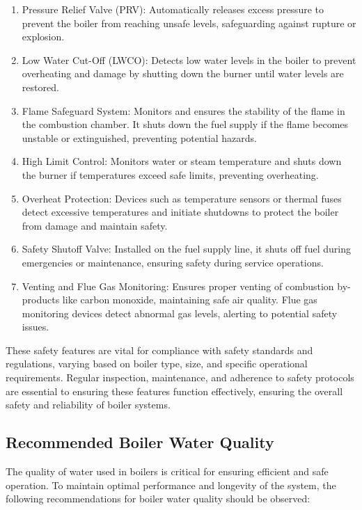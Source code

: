 \begin{enumerate}
    \item Pressure Relief Valve (PRV): Automatically releases excess pressure to prevent the boiler from reaching unsafe levels, safeguarding against rupture or explosion.
    \item Low Water Cut-Off (LWCO): Detects low water levels in the boiler to prevent overheating and damage by shutting down the burner until water levels are restored.
    \item Flame Safeguard System: Monitors and ensures the stability of the flame in the combustion chamber. It shuts down the fuel supply if the flame becomes unstable or extinguished, preventing potential hazards.
    \item High Limit Control: Monitors water or steam temperature and shuts down the burner if temperatures exceed safe limits, preventing overheating.
    \item Overheat Protection: Devices such as temperature sensors or thermal fuses detect excessive temperatures and initiate shutdowns to protect the boiler from damage and maintain safety.
    \item Safety Shutoff Valve: Installed on the fuel supply line, it shuts off fuel during emergencies or maintenance, ensuring safety during service operations.
    \item Venting and Flue Gas Monitoring: Ensures proper venting of combustion by-products like carbon monoxide, maintaining safe air quality. Flue gas monitoring devices detect abnormal gas levels, alerting to potential safety issues.
\end{enumerate}

These safety features are vital for compliance with safety standards and regulations, varying based on boiler type, size, and specific operational requirements. Regular inspection, maintenance, and adherence to safety protocols are essential to ensuring these features function effectively, ensuring the overall safety and reliability of boiler systems.


\subsection{Recommended Boiler Water Quality}
The quality of water used in boilers is critical for ensuring efficient and safe operation. To maintain optimal performance and longevity of the system, the following recommendations for boiler water quality should be observed:

